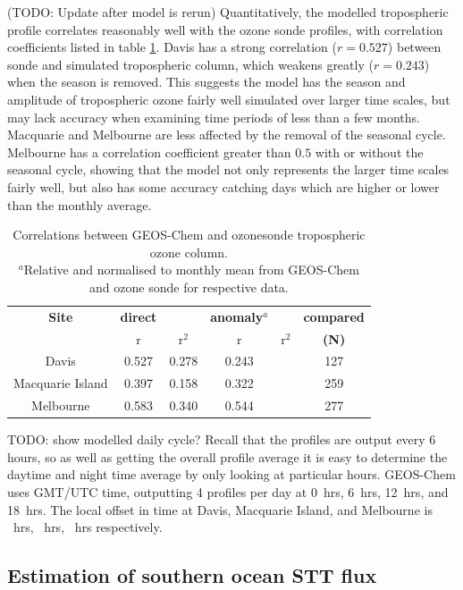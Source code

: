     (TODO: Update after model is rerun)
    Quantitatively, the modelled tropospheric profile correlates reasonably well with the ozone sonde profiles, with correlation coefficients listed in table \ref{ch_o3:tab:station_correlations}.
    Davis has a strong correlation ($r=0.527$) between sonde and simulated tropospheric column, which weakens greatly ($r=0.243$) when the season is removed.
    This suggests the model has the season and amplitude of tropospheric ozone fairly well simulated over larger time scales, but may lack accuracy when examining time periods of less than a few months.
    Macquarie and Melbourne are less affected by the removal of the seasonal cycle.
    Melbourne has a correlation coefficient greater than $0.5$ with or without the seasonal cycle, showing that the model not only represents the larger time scales fairly well, but also has some accuracy catching days which are higher or lower than the monthly average.
    
    \begin{table}
    \begin{tabular}{ | c  c  c  c  c  c | }
      \hline
      \textbf{Site} & \textbf{direct} & & \textbf{anomaly$^a$} & & \textbf{compared}
      \\            & r  & r$^2$      & r & r$^2$   & \textbf{(N)}
      \\ \hline
      Davis & 0.527 & 0.278 & 0.243 & & 127
      \\
      Macquarie Island &  0.397 & 0.158 & 0.322 & & 259
      \\ %
      Melbourne & 0.583 & 0.340 & 0.544 & & 277
      \\ \hline
    \end{tabular}
    \caption{Correlations between GEOS-Chem and ozonesonde tropospheric ozone column.
    \hspace{\textwidth} \\ 
    ${}^a$Relative and normalised to monthly mean from GEOS-Chem and ozone sonde for respective data. \hspace{\textwidth} \\ }
    \label{ch_o3:tab:station_correlations}
    \end{table}
        
    TODO: show modelled daily cycle?
    Recall that the profiles are output every 6 hours, so as well as getting the overall profile average it is easy to determine the daytime and night time average by only looking at particular hours.
    GEOS-Chem uses GMT/UTC time, outputting 4 profiles per day at 0~hrs, 6~hrs, 12~hrs, and 18~hrs.
    The local offset in time at Davis, Macquarie Island, and Melbourne is ~hrs, ~hrs, ~hrs respectively.
    
  \subsection{Estimation of southern ocean STT flux}
    
    